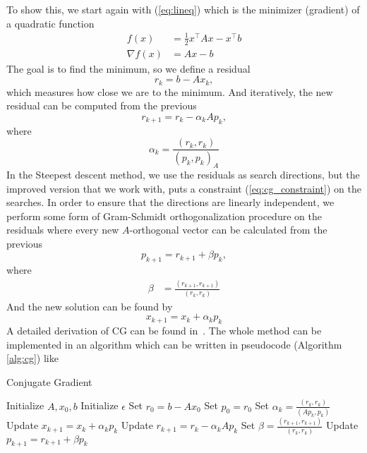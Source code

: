 To show this, we start again with (\ref{eq:lineq}) which is the minimizer (gradient) of a quadratic function
\begin{equation}
    \begin{aligned}
        f(x) &= \frac{1}{2} x^\top A x - x^\top b
        \\
        \nabla f(x) &=  Ax - b
    \end{aligned}
\end{equation}
The goal is to find the minimum, so we define a residual 
\begin{equation}
    r_k = b - Ax_k,
\end{equation}
which measures how close we are to the minimum. And iteratively, the new residual can be computed from the previous
\begin{equation}
    r_{k+1} = r_k - \alpha_k Ap_k,
\end{equation}
where
\begin{equation}
    \alpha_k = \frac{\left( r_k, r_k \right)}{\left( p_k, p_k \right)_A}
\end{equation}
In the Steepest descent method, we use the residuals as search directions, but the improved version that we work with, puts a constraint (\ref{eq:cg_constraint}) on the searches. In order to ensure that the directions are linearly independent, we perform some form of Gram-Schmidt orthogonalization procedure on the residuals where every new $A$-orthogonal vector can be calculated from the previous
\begin{equation}
    p_{k+1} = r_{k+1} + \beta p_k,
\end{equation}
where
\begin{align}
    \beta &= \frac{\left( r_{k+1}, r_{k+1} \right)}{\left( r_k, r_k \right)}
\end{align}
And the new solution can be found by
\begin{equation}
    x_{k+1} = x_k + \alpha_k p_k
\end{equation}
A detailed derivation of CG can be found in~\cite{cgbook}. The whole method can be implemented in an algorithm which can be written in pseudocode (Algorithm \ref{alg:cg}) like

\begin{algorithm}
    \caption{Conjugate Gradient}
    \begin{algorithmic}[1]
        \State Initialize  $A, x_0, b$
        \State Initialize $\epsilon$ 
        \State Set $r_0 = b - Ax_0$ 
        \State Set $p_0 = r_0$ 
            \State Set $\alpha_k = \frac{\left( r_k, r_k \right)}{\left( Ap_k, p_k \right)}$
            \State Update $x_{k+1} = x_k + \alpha_k p_k$
            \State Update $r_{k+1} = r_k - \alpha_k Ap_k$
            \State Set $\beta = \frac{\left( r_{k+1}, r_{k+1} \right)}{\left( r_k, r_k \right)}$
            \State Update $p_{k+1} = r_{k+1} + \beta p_k$
        \EndWhile
    \end{algorithmic}
    \label{alg:cg}
    \end{algorithm}

